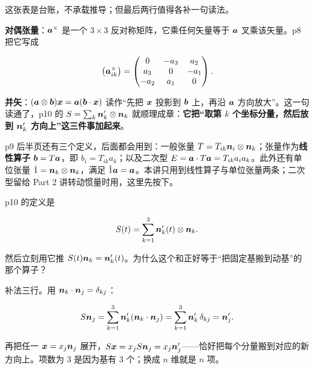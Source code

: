\documentclass[11pt]{ctexart}
\begin{document}
这张表是台账，不承载推导；但最后两行值得各补一句读法。

\textbf{对偶张量}：$\boldsymbol{a}^{\times}$ 是一个 $3\times3$ 反对称矩阵，它乘任何矢量等于 $\boldsymbol{a}$ 叉乘该矢量。p8 把它写成

\[
\bigl(\boldsymbol{a}^{\times}_{ik}\bigr)=
\begin{pmatrix}
0 & -a_3 & a_2\\
a_3 & 0 & -a_1\\
-a_2 & a_1 & 0
\end{pmatrix}.
\]


\textbf{并矢}：$(\boldsymbol{a}\otimes\boldsymbol{b})\boldsymbol{x}=\boldsymbol{a}(\boldsymbol{b}\cdot\boldsymbol{x})$ 读作“先把 $\boldsymbol{x}$ 投影到 $\boldsymbol{b}$ 上，再沿 $\boldsymbol{a}$ 方向放大”。这一句读通了，p10 的 $S=\sum_k\boldsymbol{n}'_k\otimes\boldsymbol{n}_k$ 就顺理成章：\textbf{它把“取第 $k$ 个坐标分量，然后放到 $\boldsymbol{n}'_k$ 方向上”这三件事加起来}。

p9 后半页还有三个定义，后面都会用到：一般张量 $T=T_{ik}\boldsymbol{n}_i\otimes\boldsymbol{n}_k$；张量作为\textbf{线性算子} $\boldsymbol{b}=T\boldsymbol{a}$，即 $b_i=T_{ik}a_k$；以及二次型 $E=\boldsymbol{a}\cdot T\boldsymbol{a}=T_{ik}a_ia_k$。此外还有单位张量 $\hat{1}=\boldsymbol{n}_k\otimes\boldsymbol{n}_k$，满足 $\hat{1}\boldsymbol{a}=\boldsymbol{a}$。本讲只用到线性算子与单位张量两条；二次型留给 Part 2 讲转动惯量时用，这里先按下。


p10 的定义是

\[
S(t)=\sum_{k=1}^{3}\boldsymbol{n}'_k(t)\otimes\boldsymbol{n}_k .
\]

然后立刻用它推 $S(t)\boldsymbol{n}_k=\boldsymbol{n}'_k(t)$。为什么这个和正好等于“把固定基搬到动基”的那个算子？


补法三行。用 $\boldsymbol{n}_k\cdot\boldsymbol{n}_j=\delta_{kj}$：

\[
S\boldsymbol{n}_j=\sum_{k=1}^{3}\boldsymbol{n}'_k(\boldsymbol{n}_k\cdot\boldsymbol{n}_j)
=\sum_{k=1}^{3}\boldsymbol{n}'_k\,\delta_{kj}=\boldsymbol{n}'_j .
\]

再把任一 $\boldsymbol{x}=x_j\boldsymbol{n}_j$ 展开，$S\boldsymbol{x}=x_jS\boldsymbol{n}_j=x_j\boldsymbol{n}'_j$——恰好把每个分量搬到对应的新方向上。项数为 3 是因为基有 3 个；换成 $n$ 维就是 $n$ 项。
\end{document}
